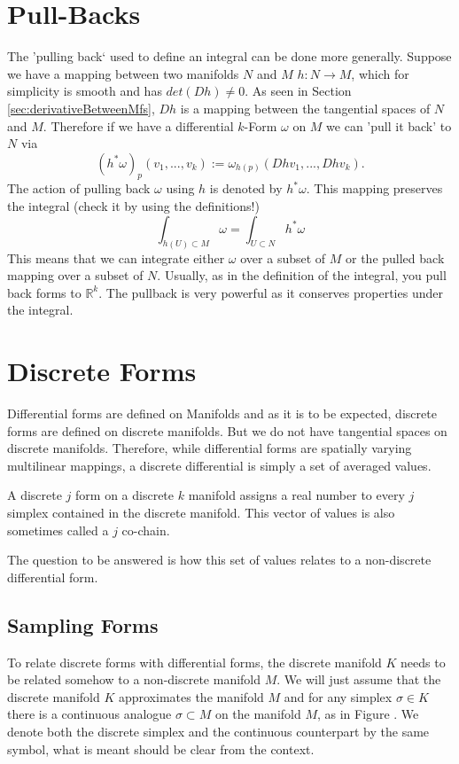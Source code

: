 \section{Pull-Backs}
\label{sec:pullbacks}
The 'pulling back` used to define an integral can be done more generally. Suppose we have a mapping between two manifolds $N$ and $M$ $h: N\to M$, which for simplicity  is smooth and has $det(Dh) \neq 0$. As seen in Section \ref{sec:derivativeBetweenMfs}, $Dh$ is a mapping between the tangential spaces of $N$ and $M$. Therefore if we have a differential $k$-Form $\omega$ on $M$ we can 'pull it back' to $N$ via
\[(h^*\omega)_p (v_1,...,v_k) := \omega_{h(p)}(Dh v_1,...,Dh v_k). \]
 The action of pulling back $\omega$ using $h$ is denoted by $h^* \omega$. This mapping preserves the integral (check it by using the definitions!)
\[\int_{h(U)\subset M} \omega = \int_{U \subset N} h^*\omega \]
This means that we can integrate either $\omega$ over a subset of $M$ or the pulled back mapping over a subset of $N$. Usually, as in the definition of the integral, you pull back forms to $\mathbb R^k$.
The pullback is very powerful as it conserves properties under the integral. 

\section{Discrete Forms}
Differential forms are defined on Manifolds and as it is to be expected, discrete forms are defined on discrete manifolds. But we do not have tangential spaces on discrete manifolds. Therefore, while differential forms are spatially varying multilinear mappings, a discrete differential is simply a set of averaged values.

\begin{definition}
A discrete $j$ form on a discrete $k$ manifold assigns a real number to every $j$ simplex contained in the discrete manifold.  This vector of values is also sometimes called a $j$ co-chain. 
\end{definition}
The question to be answered is how this set of values relates to a non-discrete differential form.

\subsection{Sampling Forms}
\label{subsec:samplingForms}
To relate discrete forms with differential forms, the discrete manifold $K$ needs to be related somehow to a non-discrete manifold $M$. We will just assume that the discrete manifold $K$ approximates the manifold $M$ and for any simplex $\sigma \in K$ there is a continuous analogue $\sigma \subset M$ on the manifold $M$, as in Figure . We denote both the discrete simplex and the continuous counterpart by the same symbol, what is meant should be clear from the context.

